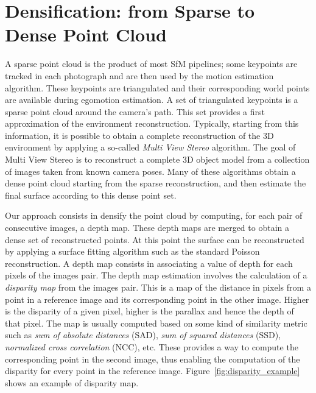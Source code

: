\section{Densification: from Sparse to Dense Point Cloud}
A sparse point cloud is the product of most SfM pipelines; some keypoints are tracked in each photograph and are then used by the motion estimation algorithm. These keypoints are triangulated and their corresponding world points are available during egomotion estimation.
%
A set of triangulated keypoints is a sparse point cloud around the camera's path. This set provides a first approximation of the environment reconstruction.
Typically, starting from this information, it is possible to obtain a complete reconstruction of the 3D environment by applying
a so-called \emph{Multi View Stereo} algorithm. The goal of Multi View Stereo\cite{seitz2006comparison} is to reconstruct a complete
3D object model from a collection of images taken from known camera poses.
Many of these algorithms obtain a dense point cloud starting from the sparse reconstruction, and then 
estimate the final surface according to this dense point set.

Our approach consists in densify the point cloud by computing, for each pair of consecutive images, 
a depth map. These depth maps are merged to obtain a dense set of reconstructed points. At this point the 
surface can be reconstructed by applying a surface fitting algorithm such as the standard Poisson reconstruction.
A depth map consists in associating a value of depth for each pixels of the images pair.
The depth map estimation involves the calculation of a \emph{disparity map} from the images pair. 
This is a map of the distance in pixels from a point in a reference image and its corresponding point in the 
other image. Higher is the disparity of a given pixel, higher is the parallax and hence the depth of that pixel. 
The map is usually computed based on some kind of similarity 
metric such as \emph{sum of absolute distances} (SAD), 
\emph{sum of squared distances} (SSD), 
\emph{normalized cross correlation} (NCC), etc. These provides a way to 
compute the corresponding point in the second image, thus enabling the 
computation of the disparity for every point in the reference image.
Figure~\ref{fig:disparity_example} shows an example of disparity map.

